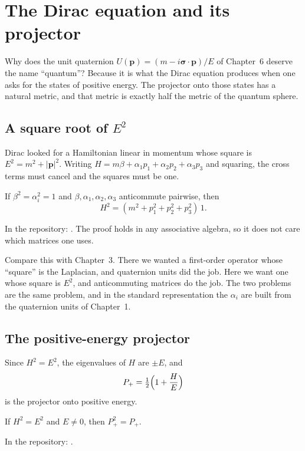 \chapter{The Dirac equation and its projector}\label{ch:dirac}

\begin{questionbox}
Why does the unit quaternion $U(\mathbf p)=(m-i\boldsymbol\sigma\cdot\mathbf p)/E$ of Chapter~6 deserve the name ``quantum''? Because it is what the Dirac equation produces when one asks for the states of positive energy. The projector onto those states has a natural metric, and that metric is exactly half the metric of the quantum sphere.
\end{questionbox}

\section{A square root of $E^2$}

Dirac looked for a Hamiltonian linear in momentum whose square is $E^2=m^2+|\mathbf p|^2$. Writing $H=m\beta+\alpha_1p_1+\alpha_2p_2+\alpha_3p_3$ and squaring, the cross terms must cancel and the squares must be one.

\begin{proposition}\proved
If $\beta^2=\alpha_i^2=1$ and $\beta,\alpha_1,\alpha_2,\alpha_3$ anticommute pairwise, then
\[
H^2=(m^2+p_1^2+p_2^2+p_3^2)\,1 .
\]
\end{proposition}
\noindent In the repository: . The proof holds in any associative algebra, so it does not care which matrices one uses.

Compare this with Chapter~3. There we wanted a first-order operator whose ``square'' is the Laplacian, and quaternion units did the job. Here we want one whose square is $E^2$, and anticommuting matrices do the job. The two problems are the same problem, and in the standard representation the $\alpha_i$ are built from the quaternion units of Chapter~1.

\section{The positive-energy projector}

Since $H^2=E^2$, the eigenvalues of $H$ are $\pm E$, and
\[
P_+=\tfrac12\Bigl(1+\frac HE\Bigr)
\]
is the projector onto positive energy.

\begin{proposition}\proved
If $H^2=E^2$ and $E\ne0$, then $P_+^2=P_+$.
\end{proposition}
\noindent In the repository: .

